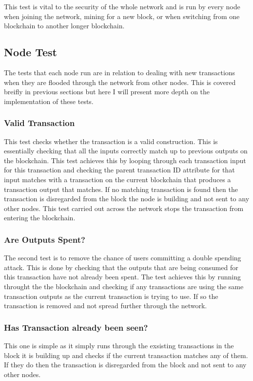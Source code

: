 \documentclass{l4proj}
\begin{document}
This test is vital to the security of the whole network and is run by every node when joining the network,
mining for a new block, or when switching from one blockchain to another longer blockchain.

\subsection{Node Test}
The tests that each node run are in relation to dealing with new transactions when they are flooded through
the network from other nodes. This is covered breifly in previous sections but here I will present more depth
on the implementation of these tests.

\subsubsection{Valid Transaction}
This test checks whether the transaction is a valid construction. This is essentially checking that all the inputs
correctly match up to previous outputs on the blockchain. This test achieves this by looping through each transaction
input for this transaction and checking the parent transaction ID attribute for that input matches with a transaction
on the current blockchain that produces a transaction output that matches. If no matching transaction is found
then the transaction is disregarded from the block the node is building and not sent to any other nodes. This test
carried out across the network stops the transaction from entering the blockchain.

\subsubsection{Are Outputs Spent?}
The second test is to remove the chance of users committing a double spending attack. This is done by checking
that the outputs that are being consumed for this transaction have not already been spent. The test achieves this
by running throught the the blockchain and checking if any transactions are using the same transaction outputs 
as the current transaction is trying to use. If so the transaction is removed and not spread further through
the network.

\subsubsection{Has Transaction already been seen?}
This one is simple as it simply runs through the exsisting transactions in the block it is building up and
checks if the current transaction matches any of them. If they do then the transaction is disregarded from the
block and not sent to any other nodes.
\end{document}
